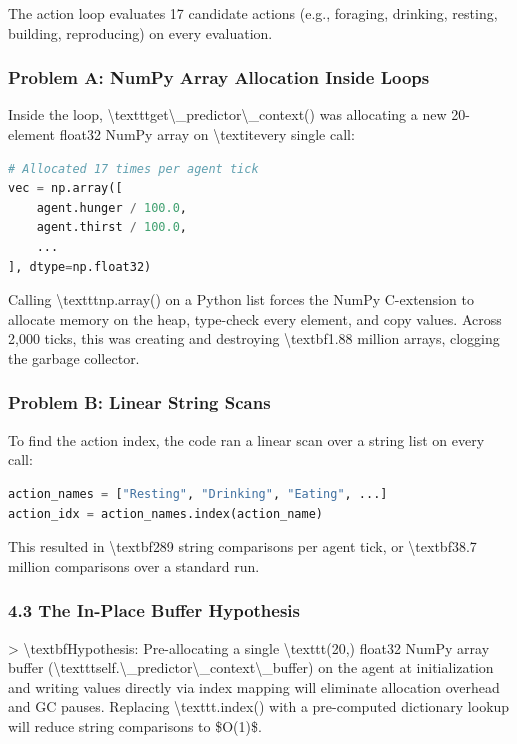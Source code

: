 \documentclass[11pt,a4paper]{article}
\begin{document}
The action loop evaluates 17 candidate actions (e.g., foraging, drinking, resting, building, reproducing) on every evaluation. 

\subsubsection*{Problem A: NumPy Array Allocation Inside Loops}
Inside the loop, \textbackslash{}texttt{get\textbackslash{}\_predictor\textbackslash{}\_context()} was allocating a new 20-element float32 NumPy array on \textbackslash{}textit{every single call}:
\begin{lstlisting}[language=python]
# Allocated 17 times per agent tick
vec = np.array([
    agent.hunger / 100.0,
    agent.thirst / 100.0,
    ...
], dtype=np.float32)
\end{lstlisting}
Calling \textbackslash{}texttt{np.array()} on a Python list forces the NumPy C-extension to allocate memory on the heap, type-check every element, and copy values. Across 2,000 ticks, this was creating and destroying \textbackslash{}textbf{1.88 million arrays}, clogging the garbage collector.

\subsubsection*{Problem B: Linear String Scans}
To find the action index, the code ran a linear scan over a string list on every call:
\begin{lstlisting}[language=python]
action_names = ["Resting", "Drinking", "Eating", ...]
action_idx = action_names.index(action_name)
\end{lstlisting}
This resulted in \textbackslash{}textbf{289 string comparisons} per agent tick, or \textbackslash{}textbf{38.7 million} comparisons over a standard run.

\subsubsection*{4.3 The In-Place Buffer Hypothesis}
\textgreater{} \textbackslash{}textbf{Hypothesis:} Pre-allocating a single \textbackslash{}texttt{(20,)} float32 NumPy array buffer (\textbackslash{}texttt{self.\textbackslash{}\_predictor\textbackslash{}\_context\textbackslash{}\_buffer}) on the agent at initialization and writing values directly via index mapping will eliminate allocation overhead and GC pauses. Replacing \textbackslash{}texttt{.index()} with a pre-computed dictionary lookup will reduce string comparisons to \$O(1)\$.
\end{document}
